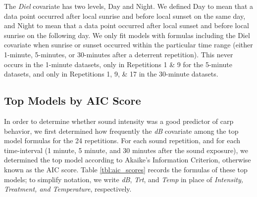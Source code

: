 \documentclass[12pt]{article}
\begin{document}
	The \emph{Diel} covariate has two levels, Day and Night. We defined Day to mean that a data point occurred after local sunrise and before local sunset on the same day, and Night to mean that a data point occurred after local sunset and before local sunrise on the following day. We only fit models with formulas including the Diel covariate when sunrise or sunset occurred within the particular time range (either 1-minute, 5-minutes, or 30-minutes after a deterrent repetition). This never occurs in the 1-minute datasets, only in Repetitions 1 \& 9 for the 5-minute datasets, and only in Repetitions 1, 9, \& 17 in the 30-minute datasets.
	
	\subsection{Top Models by AIC Score}
	
	In order to determine whether sound intensity was a good predictor of carp behavior, we first determined how frequently the \emph{dB} covariate among the top model formulas for the 24 repetitions. For each sound repetition, and for each time-interval (1 minute, 5 minute, and 30 minutes after the sound exposure), we determined the top model according to Akaike's Information Criterion, otherwise known as the AIC score. Table \ref{tbl:aic_scores} records the formulas of these top models; to simplify notation, we write \emph{dB}, \emph{Trt}, and \emph{Temp} in place of \emph{Intensity, Treatment, and Temperature}, respectively.
	
\end{document}
